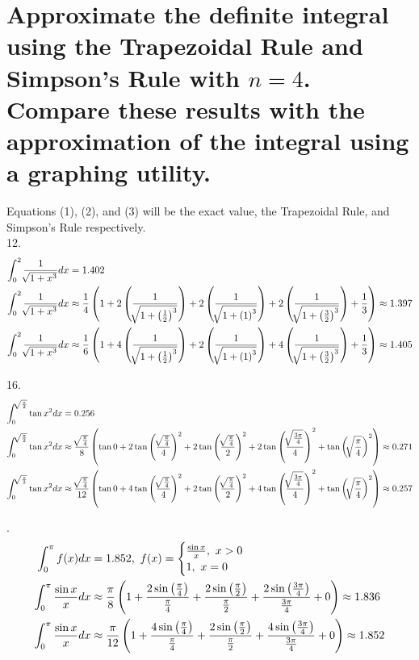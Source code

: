 \documentclass[11pt]{article}
\newcommand*{\vs}{\vspace{1cm}}
\newcommand*{\next}{\noindent}
\newcommand*{\set}{\setcounter{equation}{0}}
\newcommand*{\lt}{\left}
\newcommand*{\rt}{\right}
\begin{document}
\section{Approximate the definite integral using the
Trapezoidal Rule and Simpson’s Rule with $n=4$. Compare
these results with the approximation of the integral using a
graphing utility.}
Equations (1), (2), and (3) will be the exact value, the Trapezoidal Rule, and Simpson's Rule respectively.\\
12.\begin{align}
    \set
    \int_{0}^{2}\frac{1}{\sqrt[]{1+x^3}}dx&=1.402\\
    \int_{0}^{2}\frac{1}{\sqrt[]{1+x^3}}dx&\approx\frac{1}{4}\lt(1+2\lt(\frac{1}{\sqrt[]{1+\lt(\frac{1}{2}\rt)^3}}\rt)+2\lt(\frac{1}{\sqrt[]{1+\lt(1\rt)^3}}\rt)+2\lt(\frac{1}{\sqrt[]{1+\lt(\frac{3}{2}\rt)^3}}\rt)+\frac{1}{3}\rt)\approx 1.397\\
    \int_{0}^{2}\frac{1}{\sqrt[]{1+x^3}}dx&\approx\frac{1}{6}\lt(1+4\lt(\frac{1}{\sqrt[]{1+\lt(\frac{1}{2}\rt)^3}}\rt)+2\lt(\frac{1}{\sqrt[]{1+\lt(1\rt)^3}}\rt)+4\lt(\frac{1}{\sqrt[]{1+\lt(\frac{3}{2}\rt)^3}}\rt)+\frac{1}{3}\rt)\approx 1.405
\end{align}

16.\begin{align}
    \set
    \int_{0}^{\sqrt[]{\frac{\pi}{2}}}\tan x^2dx&=0.256\\
    \int_{0}^{\sqrt[]{\frac{\pi}{2}}}\tan x^2dx&\approx\frac{\sqrt[]{\frac{\pi}{4}}}{8}\lt(\tan 0+2\tan\lt(\frac{\sqrt[]{\frac{\pi}{4}}}{4}\rt)^2+2\tan\lt(\frac{\sqrt[]{\frac{\pi}{4}}}{2}\rt)^2+2\tan\lt(\frac{\sqrt[]{\frac{3\pi}{4}}}{4}\rt)^2+\tan\lt(\sqrt[]{\frac{\pi}{4}}\rt)^2\rt)\approx 0.271\\
    \int_{0}^{\sqrt[]{\frac{\pi}{2}}}\tan x^2dx&\approx\frac{\sqrt[]{\frac{\pi}{4}}}{12}\lt(\tan 0+4\tan\lt(\frac{\sqrt[]{\frac{\pi}{4}}}{4}\rt)^2+2\tan\lt(\frac{\sqrt[]{\frac{\pi}{4}}}{2}\rt)^2+4\tan\lt(\frac{\sqrt[]{\frac{3\pi}{4}}}{4}\rt)^2+\tan\lt(\sqrt[]{\frac{\pi}{4}}\rt)^2\rt)\approx 0.257
\end{align}

\vs\next
20.\begin{align}
    \set
    \int_{0}^{\pi}f(x)dx&=1.852,\,\, f(x)=\begin{cases}
        \frac{\sin x}{x},\,\, x>0\\
        1,\,\, x=0
        \end{cases}\\
    \int_{0}^{\pi}\frac{\sin x}{x}dx&\approx\frac{\pi}{8}\lt(1+\frac{2\sin\lt(\frac{\pi}{4}\rt)}{\frac{\pi}{4}}+\frac{2\sin\lt(\frac{\pi}{2}\rt)}{\frac{\pi}{2}}+\frac{2\sin\lt(\frac{3\pi}{4}\rt)}{\frac{3\pi}{4}}+0\rt)\approx 1.836\\
    \int_{0}^{\pi}\frac{\sin x}{x}dx&\approx\frac{\pi}{12}\lt(1+\frac{4\sin\lt(\frac{\pi}{4}\rt)}{\frac{\pi}{4}}+\frac{2\sin\lt(\frac{\pi}{2}\rt)}{\frac{\pi}{2}}+\frac{4\sin\lt(\frac{3\pi}{4}\rt)}{\frac{3\pi}{4}}+0\rt)\approx 1.852
\end{align}
\end{document}

